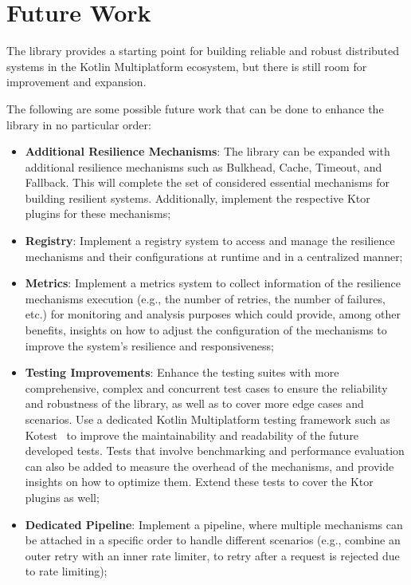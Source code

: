 \section{Future Work}\label{sec:future-work}

The library provides a starting point for building reliable and robust distributed systems in the Kotlin Multiplatform ecosystem, but there is still room for improvement and expansion.

The following are some possible future work that can be done to enhance the library in no particular order:

\begin{itemize}
    \item \textbf{Additional Resilience Mechanisms}:
    The library can be expanded with additional resilience mechanisms such as Bulkhead,
    Cache, Timeout, and Fallback.
    This will complete the set of considered essential mechanisms for building resilient systems.
    Additionally, implement the respective Ktor plugins for these mechanisms;
    \item \textbf{Registry}:
    Implement a registry system
    to access and manage the resilience mechanisms and their configurations at runtime and in a centralized manner;
    \item \textbf{Metrics}:
    Implement a metrics system to collect information of the resilience mechanisms execution (e.g., the number of retries, the number of failures, etc.) for monitoring and analysis purposes which could provide, among other benefits, insights on how to adjust the configuration of the mechanisms to improve the system's resilience and responsiveness;
    \item \textbf{Testing Improvements}:
    Enhance the testing suites with more comprehensive, complex and concurrent test cases
    to ensure the reliability and robustness of the library, as well as to cover more edge cases and scenarios.
    Use a dedicated Kotlin Multiplatform testing framework such as Kotest~\cite{kotest}
    to improve the maintainability and readability of the future developed tests.
    Tests that involve benchmarking and performance evaluation can also be added to measure the overhead of the mechanisms,
    and provide insights on how to optimize them.
    Extend these tests to cover the Ktor plugins as well;
    \item \textbf{Dedicated Pipeline}:
    Implement a pipeline,
    where multiple mechanisms can be attached in a specific order to handle different scenarios (e.g., combine an outer retry with an inner rate limiter, to retry after a request is rejected due to rate limiting);

\end{itemize}
